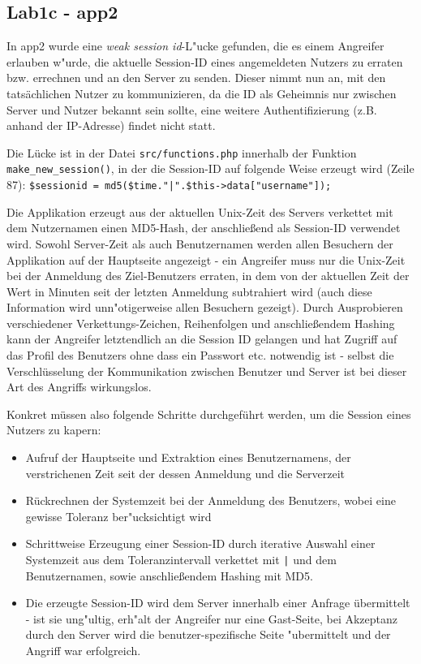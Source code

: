 \documentclass[12pt,a4paper,titlepage,oneside]{scrartcl}
\begin{document}
\subsection{Lab1c - app2}

In app2 wurde eine \textit{weak session id}-L"ucke gefunden, die es einem Angreifer erlauben w"urde, die aktuelle Session-ID eines angemeldeten Nutzers zu erraten bzw. errechnen und an den Server zu senden. Dieser nimmt nun an, mit den tatsächlichen Nutzer zu kommunizieren, da die ID als Geheimnis nur zwischen Server und Nutzer bekannt sein sollte, eine weitere Authentifizierung (z.B. anhand der IP-Adresse) findet nicht statt.

Die Lücke ist in der Datei \texttt{src/functions.php} innerhalb der Funktion \texttt{make\_new\_session()}, in der die Session-ID auf folgende Weise erzeugt wird (Zeile 87): \lstinline{$sessionid = md5($time."|".$this->data["username"]);}

Die Applikation erzeugt aus der aktuellen Unix-Zeit des Servers verkettet mit dem Nutzernamen einen MD5-Hash, der anschließend als Session-ID verwendet wird. Sowohl Server-Zeit als auch Benutzernamen werden allen Besuchern der Applikation auf der Hauptseite angezeigt - ein Angreifer muss nur die Unix-Zeit bei der Anmeldung des Ziel-Benutzers erraten, in dem von der aktuellen Zeit der Wert in Minuten seit der letzten Anmeldung subtrahiert wird (auch diese Information wird unn"otigerweise allen Besuchern gezeigt). Durch Ausprobieren verschiedener Verkettungs-Zeichen, Reihenfolgen und anschließendem Hashing kann der Angreifer letztendlich an die Session ID gelangen und hat Zugriff auf das Profil des Benutzers ohne dass ein Passwort etc. notwendig ist - selbst die Verschlüsselung der Kommunikation zwischen Benutzer und Server ist bei dieser Art des Angriffs wirkungslos.

Konkret müssen also folgende Schritte durchgeführt werden, um die Session eines Nutzers zu kapern:

\begin{itemize}
\item Aufruf der Hauptseite und Extraktion eines Benutzernamens, der verstrichenen Zeit seit der dessen Anmeldung und die Serverzeit
\item Rückrechnen der Systemzeit bei der Anmeldung des Benutzers, wobei eine gewisse Toleranz ber"ucksichtigt wird
\item Schrittweise Erzeugung einer Session-ID durch iterative Auswahl einer Systemzeit aus dem Toleranzintervall verkettet mit \texttt{|} und dem Benutzernamen, sowie anschließendem Hashing mit MD5.
\item Die erzeugte Session-ID wird dem Server innerhalb einer Anfrage übermittelt - ist sie ung"ultig, erh"alt der Angreifer nur eine Gast-Seite, bei Akzeptanz durch den Server wird die benutzer-spezifische Seite "ubermittelt und der Angriff war erfolgreich.
\end{itemize}
\end{document}
